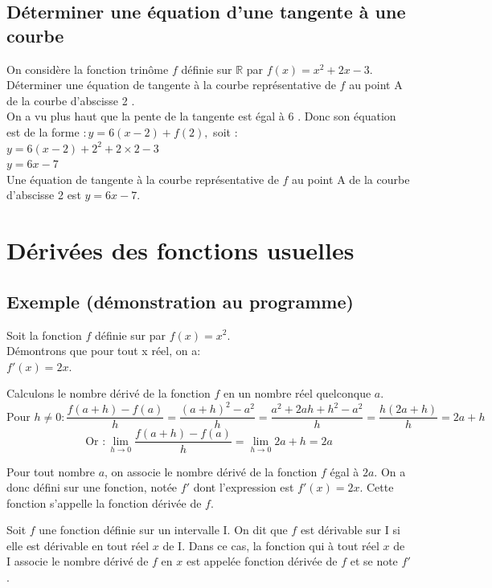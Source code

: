 \subsection{Déterminer une équation d'une tangente à une courbe}

\begin{methode}
    On considère la fonction trinôme $f$ définie sur $\mathbb{R}$ par $f(x)=x^{2}+2 x-3$.\\ Déterminer une équation de tangente à la courbe représentative de $f$ au point $\mathrm{A}$ de la courbe d'abscisse 2 .\\
    On a vu plus haut que la pente de la tangente est égal à 6 . Donc son équation est de la forme $: y=6(x-2)+f(2),$ soit :\\
    $y=6(x-2)+2^{2}+2 \times 2-3$\\
    $y=6 x-7$\\
    Une équation de tangente à la courbe représentative de $f$ au point $\mathrm{A}$ de la courbe d'abscisse 2 est $y=6 x-7$.
\end{methode}

\section{Dérivées des fonctions usuelles}

\subsection{Exemple (démonstration au programme)}
\begin{demonstration}
    Soit la fonction $f$ définie sur \R par $f(x)=x^2$.\\ 
    Démontrons que pour tout x réel, on a:\\
    $f'(x)=2x$.


Calculons le nombre dérivé de la fonction $f$ en un nombre réel quelconque $a$. 
\[ \text{Pour }h\neq0:\frac{f(a+h)-f(a)}{h}=\frac{(a+h)^2-a^2}{h}=\frac{a^2+2ah+h^2-a^2}{h}=\frac{h(2a+h)}{h}=2a+h\]
\[ \text{Or }:\lim\limits_{h \rightarrow 0} \frac{f(a+h)-f(a)}{h} = \lim\limits_{h \rightarrow 0} 2a+h=2a\]

Pour tout nombre $a$, on associe le nombre dérivé de la fonction $f$ égal à $2a$.
On a donc défini sur \R une fonction, notée $f'$ dont l'expression est $f'(x)=2x$.
Cette fonction s'appelle la fonction dérivée de $f$.
\end{demonstration}

\begin{definition}
    Soit $f$ une fonction définie sur un intervalle I.
    On dit que $f$ est dérivable sur I si elle est dérivable en tout réel $x$ de I.
    Dans ce cas, la fonction qui à tout réel $x$ de I associe le nombre dérivé de $f$ en $x$ est appelée fonction dérivée de $f$ et se note $f'$.
\end{definition}


